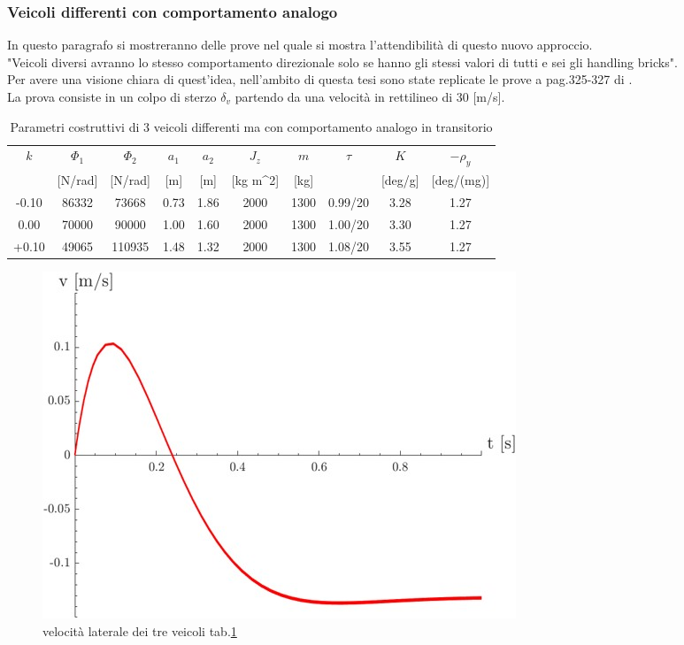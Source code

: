\subsubsection{Veicoli differenti con comportamento analogo}
In questo paragrafo si mostreranno delle prove nel quale si mostra l'attendibilità di questo nuovo approccio.\\
"Veicoli diversi avranno lo stesso comportamento direzionale solo se hanno gli stessi valori di tutti e sei gli handling
bricks".\\
Per avere una visione chiara di quest'idea, nell'ambito di questa tesi sono state replicate le prove a pag.325-327 di \cite{guiggiani2018science}.\\
La prova consiste in un colpo di sterzo $\delta_v$ partendo da una velocità in rettilineo di 30 [m/s].\\
\begin{table}[htbp]
  \centering
  \footnotesize
  \begin{tabular}{@{}|c|c|c|c|c|c|c|c|c|c|@{}}
    \hline
    $k$   & $\Phi_1$    & $\Phi_2$    & $a_1$   & $a_2$   & $J_z$   & $m$    & $\tau$    & $K$    & $-\rho_y$ \\
     & [N/rad] & [N/rad] & [m] & [m] & [kg m^2] & [kg] &  & [deg/g] & [deg/(mg)] \\
    \hline
    -0.10 & 86332 & 73668 & 0.73 & 1.86 & 2000 & 1300 & 0.99/20 & 3.28 & 1.27 \\
    \hline
    0.00  & 70000 & 90000 & 1.00 & 1.60 & 2000 & 1300 & 1.00/20 & 3.30 & 1.27 \\
    \hline
    +0.10 & 49065 & 110935& 1.48 & 1.32 & 2000 & 1300 & 1.08/20 & 3.55 & 1.27 \\
    \hline
  \end{tabular}
  \caption{Parametri costruttivi di 3 veicoli differenti ma con comportamento analogo in transitorio}
  \label{tab:table 7.1}
\end{table}

\begin{figure}[!h]
    \centering
    \includegraphics[scale=0.6]{Immagini/Understeer Gradient/table7.1 v.jpg}
    \caption{velocità laterale dei tre veicoli tab.\ref{tab:table 7.1}}
    \label{fig:table7.1 v}
\end{figure}

